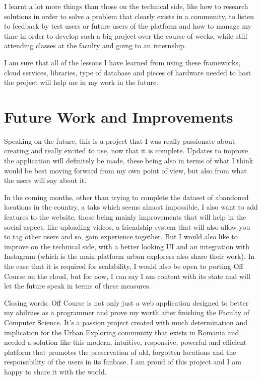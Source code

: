 \documentclass[12pt,a4paper]{report}
\begin{document}
I learnt a lot more things than those on the technical side, like how to research solutions in order to solve a problem that clearly exists in a community, to listen to feedback by test users or future users of the platform and how to manage my time in order to develop such a big project over the course of weeks, while still attending classes at the faculty and going to an internship.

I am sure that all of the lessons I have learned from using these frameworks, cloud services, libraries, type of database and pieces of hardware needed to host the project will help me in my work in the future.

\section*{Future Work and Improvements}

Speaking on the future, this is a project that I was really passionate about creating and really excited to use, now that it is complete. Updates to improve the application will definitely be made, these being also in terms of what I think would be best moving forward from my own point of view, but also from what the users will say about it.

In the coming months, other than trying to complete the dataset of abandoned locations in the country, a taks which seems almost impossible, I also want to add features to the website, those being mainly improvements that will help in the social aspect, like uploading videos, a friendship system that will also allow you to tag other users and so, gain experience together. But I would also like to improve on the technical side, with a better looking UI and an integration with Instagram (which is the main platform urban explorers also share their work). In the case that it is required for scalability, I would also be open to porting Off Course on the cloud, but for now, I can say I am content with its state and will let the future speak in terms of these measures.

Closing words: Off Course is not only just a web application designed to better my abilities as a programmer and prove my worth after finishing the Faculty of Computer Science. It's a passion project created with much determination and implication for the Urban Exploring community that exists in Romania and needed a solution like this modern, intuitive, responsive, powerful and efficient platform that promotes the preservation of old, forgotten locations and the responsibility of the users in its fanbase. I am proud of this project and I am happy to share it with the world.



\end{document}
